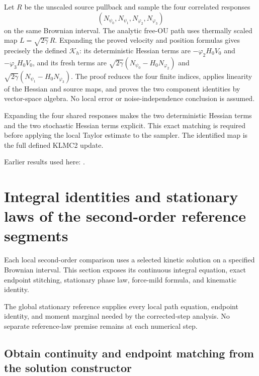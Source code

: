 \documentclass[11pt,a4paper]{report}
\begin{document}
Let \(R\) be the unscaled source pullback and sample the four correlated responses
\[(N_{\psi_0},N_{\psi_1},N_{\varphi_2},N_{\varphi_3})\]
 on the same Brownian interval. The analytic free-OU path uses thermally scaled map \(L=\sqrt{2\gamma}\,R\). Expanding the proved velocity and position formulas gives precisely the defined \(\mathcal K_h\): its deterministic Hessian terms are \(-\varphi_2H_0V_0\) and \(-\varphi_3H_0V_0\), and its fresh terms are \(\sqrt{2\gamma}(N_{\psi_0}-H_0N_{\varphi_2})\) and \(\sqrt{2\gamma}(N_{\psi_1}-H_0N_{\varphi_3})\). The proof reduces the four finite indices, applies linearity of the Hessian and source maps, and proves the two component identities by vector-space algebra. No local error or noise-independence conclusion is assumed.



Expanding the four shared responses makes the two deterministic Hessian terms and the two stochastic Hessian terms explicit. This exact matching is required before applying the local Taylor estimate to the sampler. The identified map is the full defined KLMC2 update.



Earlier results used here: \cite[Section~3.8.17]{LangevinLean2026ULASC}.
\section{\texorpdfstring{Integral identities and stationary laws of the second-order reference segments}{Integral identities and stationary laws of the second-order reference segments}}
\label{proof-module-KineticLangevin-CanonicalSecondOrderSegments-lean}


Each local second-order comparison uses a selected kinetic solution on a specified Brownian interval. This section exposes its continuous integral equation, exact endpoint stitching, stationary phase law, force-mild formula, and kinematic identity.



The global stationary reference supplies every local path equation, endpoint identity, and moment marginal needed by the corrected-step analysis. No separate reference-law premise remains at each numerical step.

\subsection{\texorpdfstring{Obtain continuity and endpoint matching from the solution constructor}{Obtain continuity and endpoint matching from the solution constructor}}
\label{report-step-KineticLangevin-CanonicalSecondOrderSegments-lean-1}
\end{document}
